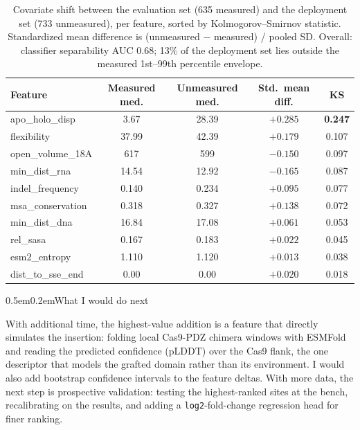 \documentclass[10pt]{article}
\makeatletter
\renewcommand\section{\@startsection{section}{1}{0pt}%
  {0.5em}{0.2em}{\normalsize\bfseries}}
\makeatother
\begin{document}
\begin{table}[h]
\centering
\caption{Covariate shift between the evaluation set (635 measured) and the deployment set (733
unmeasured), per feature, sorted by Kolmogorov--Smirnov statistic. Standardized mean difference is
(unmeasured $-$ measured) / pooled SD. Overall: classifier separability AUC 0.68; 13\% of the
deployment set lies outside the measured 1st--99th percentile envelope.}
\label{tab:shift}
\scriptsize
\begin{tabular}{lcccc}
\toprule
Feature & Measured med. & Unmeasured med. & Std.\ mean diff. & KS \\
\midrule
apo\_holo\_disp   & 3.67  & 28.39 & $+0.285$ & \textbf{0.247} \\
flexibility       & 37.99 & 42.39 & $+0.179$ & 0.107 \\
open\_volume\_18A & 617   & 599   & $-0.150$ & 0.097 \\
min\_dist\_rna    & 14.54 & 12.92 & $-0.165$ & 0.087 \\
indel\_frequency  & 0.140 & 0.234 & $+0.095$ & 0.077 \\
msa\_conservation & 0.318 & 0.327 & $+0.138$ & 0.072 \\
min\_dist\_dna    & 16.84 & 17.08 & $+0.061$ & 0.053 \\
rel\_sasa         & 0.167 & 0.183 & $+0.022$ & 0.045 \\
esm2\_entropy     & 1.110 & 1.120 & $+0.013$ & 0.038 \\
dist\_to\_sse\_end & 0.00 & 0.00  & $+0.020$ & 0.018 \\
\bottomrule
\end{tabular}
\end{table}

\section{What I would do next}

With additional time, the highest-value addition is a feature that directly simulates the
insertion: folding local Cas9-PDZ chimera windows with ESMFold and reading the predicted confidence
(pLDDT) over the Cas9 flank, the one descriptor that models the grafted domain rather than its
environment. I would also add bootstrap confidence intervals to the feature deltas. With more data,
the next step is prospective validation: testing the highest-ranked sites at the bench,
recalibrating on the results, and adding a \texttt{log2}-fold-change regression head for finer
ranking.
\end{document}
